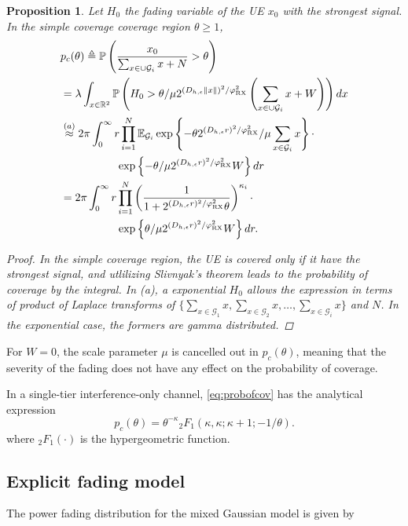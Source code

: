 \documentclass[conference]{IEEEtran}
\newcommand{\R}{\mathbb{R}}
\theoremstyle{definition}
\theoremstyle{plain}
\newtheorem{prop}[thm4]{Proposition}
\begin{document}
          \begin{prop}
            Let $H_0$ the fading variable of the UE $x_0$ with the strongest signal. In the simple coverage coverage region $\theta \geq 1$,
            \begin{align}
              \label{eq:probofcov}
              &p_c(\theta) \triangleq \mathbb{P}\left( \frac{x_0}{\sum_{x \in \cup \mathcal{G}_i}x + N} > \theta \right) \nonumber \\
              &= \lambda \int_{ x \in \R^2}\mathbb{P}\left(H_0 > \theta/\mu  2^{(D_{h,\epsilon}\|x\|)^2/\varphi^2_{\textup{RX}} } \left(\sum_{x \in \cup \mathcal{G}_i}x +W \right)\right) \nonumber dx  \nonumber  \\
              &\overset{(a)}{\approx} 2 \pi \int_{0}^{\infty} r \prod_{i=1}^{N}\mathbb{E}_{\mathcal{G}_i}\exp \left\{-\theta 2^{(D_{h,\epsilon}r)^2/\varphi^2_{\textup{RX}}}/\mu \sum_{x \in \mathcal{G}_i}x \right\}  \cdot \nonumber\\
              & \hspace{1.8cm}\exp \left\{- \theta/\mu  2^{(D_{h,\epsilon}r)^2/\varphi^2_{\textup{RX}}} W  \right\} dr \nonumber \\
              &=2 \pi \int_{0}^{\infty} r \prod_{i=1}^{N} \left(\frac{1}{1 + 2^{(D_{h,\epsilon}r)^2/\varphi^2_{\textup{RX}}} \theta}\right)^{\kappa_i}  \cdot \nonumber \\
              &\hspace{1.8cm} \exp \left\{ \theta/\mu 2^{(D_{h,\epsilon}r)^2/\varphi^2_{\textup{RX}}}W  \right\} dr.           
            \end{align}
           
            \begin{proof}
         In the simple coverage region, the UE is covered only if it have the strongest signal, and utlilizing Slivnyak's theorem leads to the probability of coverage by the integral. In (a), a exponential $H_0$ allows the expression in terms of product of Laplace transforms of $\{\sum_{x \in \mathcal{G}_1}x, \sum_{x \in \mathcal{G}_2}x, \dots, \sum_{x \in \mathcal{G}_i } x\}$  and $N$. In the exponential case, the formers are gamma distributed. 
            \end{proof}
          \end{prop}
          For $W=0$, the scale parameter $\mu$ is cancelled out in $p_c(\theta)$, meaning that the severity of the fading does not have any effect on the probability of coverage. 

          In a single-tier interference-only channel, \eqref{eq:probofcov} has the analytical expression
          \begin{equation}
p_c(\theta) =  \theta^{-\kappa} {_2F_1}\left(\kappa, \kappa;\kappa + 1; -1/\theta \right).
          \end{equation}
          where $_2F_1(\cdot)$ is the hypergeometric function.
          \subsection{Explicit fading model}
          The power fading distribution for the mixed Gaussian model is given by




          
         


         
         
             
             
\end{document}
